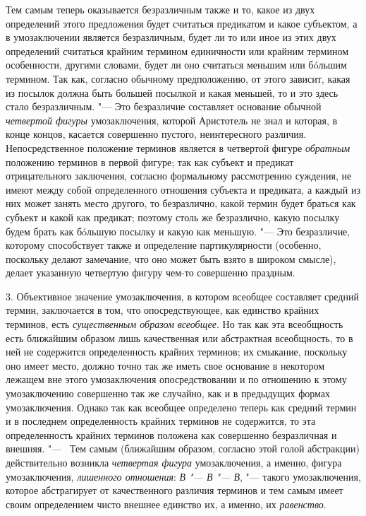 {{Тем самым теперь оказывается безразличным также и то, какое из
двух определений этого предложения будет считаться предикатом и какое
субъектом, а в умозаключении является безразличным, будет ли то или иное из
этих двух определений считаться крайним термином единичности или крайним
термином особенности, другими словами, будет ли оно считаться меньшим или
бóльшим термином. Так как, согласно обычному предположению, от этого
зависит, какая из посылок должна быть большей посылкой и какая меньшей, то
и это здесь стало безразличным. "--- Это безразличие составляет
основание обычной {\em четвертой фигуры} умозаключения,
которой Аристотель не знал и которая,
в конце концов, касается совершенно пустого, неинтересного различия.
Непосредственное положение терминов является в четвертой фигуре
{\em обратным} положению
терминов в первой фигуре; так как субъект и предикат отрицательного
заключения, согласно формальному рассмотрению суждения, не имеют между
собой определенного отношения субъекта и предиката, а каждый из них может
занять место другого, то безразлично, какой термин будет браться как
субъект и какой как предикат; поэтому столь же безразлично, какую посылку
будем брать как бóльшую посылку и какую как меньшую. "---
Это безразличие, которому способствует также и определение
партикулярности (особенно, поскольку делают замечание, что оно может быть
взято в широком смысле), делает указанную четвертую фигуру чем-то
совершенно праздным.

3. Объективное значение умозаключения, в котором всеобщее
составляет средний термин, заключается в том, что опосредствующее, как
единство крайних терминов, есть
{\em существенным образом всеобщее}.
Но так как эта всеобщность есть ближайшим образом лишь
качественная или абстрактная всеобщность, то в ней не содержится
определенность крайних терминов; их смыкание, поскольку оно имеет место,
должно точно так же иметь свое основание в некотором лежащем вне этого
умозаключения опосредствовании и по отношению к этому умозаключению
совершенно так же случайно, как и в предыдущих формах умозаключения. Однако
так как всеобщее определено теперь как средний термин и в последнем
определенность крайних терминов не содержится, то эта определенность
крайних терминов положена как совершенно безразличная и внешняя. "---
\ Тем самым (ближайшим образом, согласно этой голой
абстракции) действительно возникла
{\em четвертая фигура}
умозаключения, а именно, фигура умозаключения,
{\em лишенного отношения}:
{\em В "--- В
"--- В}, "--- такого умозаключения, которое
абстрагирует от качественного различия терминов и тем самым имеет своим
определением чисто внешнее единство их, а именно, их
{\em равенство}.

}}
